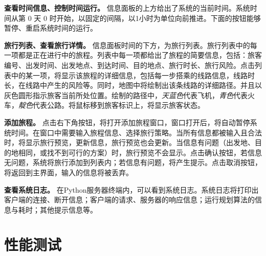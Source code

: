 \textbf{查看时间信息、控制时间运行。} \quad 信息面板的上方给出了系统的当前时间。系统时间从第 0 天 0 时开始，以固定的间隔，以1小时为单位向前推进。下面的按钮能够暂停、重启系统时间的运行。


\textbf{旅行列表、查看旅行详情。} \quad 信息面板时间的下方，为旅行列表。旅行列表中的每一项都是正在进行中的旅程。列表中每一项都给出了旅程的简要信息，包括：旅客编号、出发时间、出发地点、到达时间、目的地点、旅行时长、旅行风险。点击列表中的某一项，将显示该旅程的详细信息，包括每一步搭乘的线路信息，线路时长，在线路中产生的风险等。同时，地图中将绘制出该条线路的详细路径。并且以灰色圆形指示旅客当前所处位置。绘制的路径中，\textit{\color{air}天蓝色}代表飞机，\textit{\color{subway}青色}代表火车，\textit{\color{highway}靛色}代表公路。将鼠标移到旅客标识上，将显示旅客状态。

\textbf{添加旅程。} \quad 点击右下角按钮，将打开添加旅程窗口，窗口打开后，将自动暂停系统时间。在窗口中需要输入旅程信息、选择旅行策略。当所有信息都被输入且合法时，将显示旅行预览，更新信息，旅行预览也会更新。当信息有问题（出发地、目的地相同，或找不到可行的方案）时，旅行预览不会显示。点击确认按钮，若信息无问题，系统将旅行添加到列表内；若信息有问题，将产生提示。点击取消按钮，将返回到主界面，输入的信息将被丢弃。

\textbf{查看系统日志。} \quad 在Python服务器终端内，可以看到系统日志。系统日志将打印出客户端的连接、断开信息；客户端的请求、服务器的响应信息；运行规划算法的信息与耗时；其他提示信息等。

\section{性能测试}
\label{sec:perf-test}

\begin{table}[t]
  \centering
  \caption{在随机生成的$10^4$座城市，$10^5$条线路的地图上的性能测试表现}
  \label{tab:perf-test}
\end{table}

